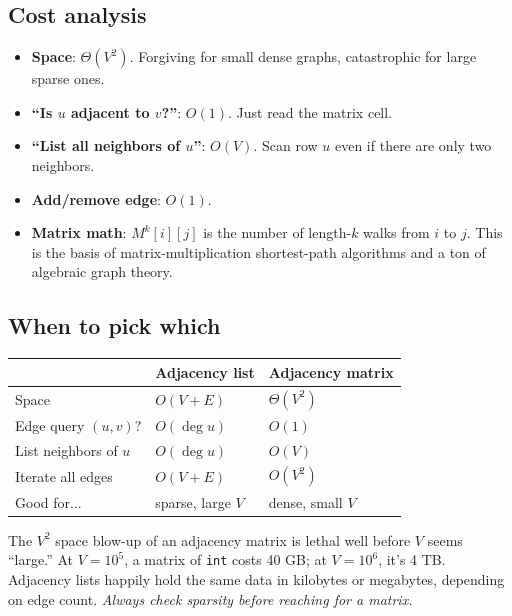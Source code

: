 \documentclass[11pt]{article}
\begin{document}
\subsection*{Cost analysis}

\begin{itemize}[leftmargin=*]
    \item \textbf{Space}: $\Theta(V^2)$. Forgiving for small dense graphs, catastrophic for large sparse ones.
    \item \textbf{``Is $u$ adjacent to $v$?''}: $O(1)$. Just read the matrix cell.
    \item \textbf{``List all neighbors of $u$''}: $O(V)$. Scan row $u$ even if there are only two neighbors.
    \item \textbf{Add/remove edge}: $O(1)$.
    \item \textbf{Matrix math}: $M^k[i][j]$ is the number of length-$k$ walks from $i$ to $j$. This is the basis of matrix-multiplication shortest-path algorithms and a ton of algebraic graph theory.
\end{itemize}

\subsection*{When to pick which}

\begin{center}
\begin{tabular}{lll}
\hline
& Adjacency list & Adjacency matrix \\
\hline
Space & $O(V+E)$ & $\Theta(V^2)$ \\
Edge query $(u,v)?$ & $O(\deg u)$ & $O(1)$ \\
List neighbors of $u$ & $O(\deg u)$ & $O(V)$ \\
Iterate all edges & $O(V+E)$ & $O(V^2)$ \\
Good for... & sparse, large $V$ & dense, small $V$ \\
\hline
\end{tabular}
\end{center}

\begin{warnbox}
The $V^2$ space blow-up of an adjacency matrix is lethal well before $V$ seems ``large.'' At $V = 10^5$, a matrix of \texttt{int} costs 40 GB; at $V = 10^6$, it's 4 TB. Adjacency lists happily hold the same data in kilobytes or megabytes, depending on edge count. \emph{Always check sparsity before reaching for a matrix.}
\end{warnbox}
\end{document}
